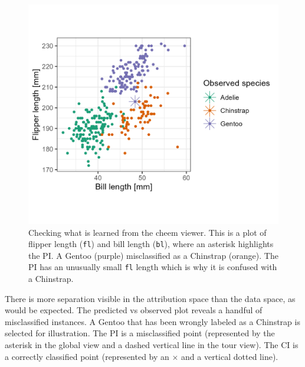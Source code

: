 \documentclass[
]{article}
\begin{document}
\begin{figure}

{\centering \includegraphics[width=1\linewidth]{./figures/case_penguins_BlFl} 

}

\caption{Checking what is learned from the cheem viewer. This is a plot of flipper length (\texttt{fl}) and bill length (\texttt{bl}), where an asterisk highlights the PI. A Gentoo (purple) misclassified as a Chinstrap (orange). The PI has an unusually small \texttt{fl} length which is why it is confused with a Chinstrap.}\label{fig:casepenguinsblfl}
\end{figure}

There is more separation visible in the attribution space than the data space, as would be expected. The predicted vs observed plot reveals a handful of misclassified instances. A Gentoo that has been wrongly labeled as a Chinstrap is selected for illustration. The PI is a misclassified point (represented by the asterisk in the global view and a dashed vertical line in the tour view). The CI is a correctly classified point (represented by an \(\times\) and a vertical dotted line).
\end{document}
